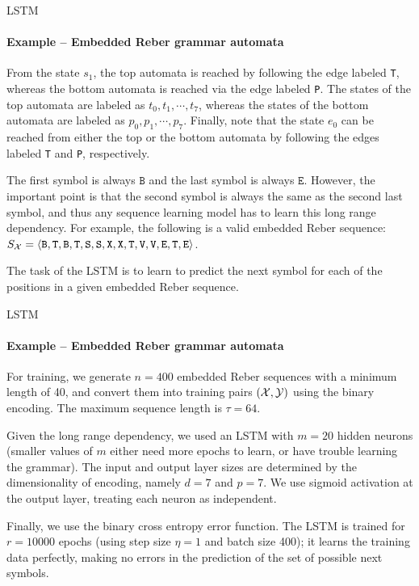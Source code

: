 \begin{frame}{LSTM}
\framesubtitle{Example -- Embedded Reber grammar automata}

\medskip

From the state $s_1$, the top automata
    is reached by following the edge labeled \texttt{T}, whereas the
    bottom automata is reached via the edge labeled \texttt{P}. 
    The states of the top automata are labeled as $t_0, t_1,\cdots,t_7$,
    whereas the states of the bottom automata are labeled as $p_0, p_1,
    \cdots, p_7$. Finally, note that the state $e_0$ can be reached
    from either the top or the bottom automata by following the edges
    labeled \texttt{T} and \texttt{P}, respectively. 

\medskip

    The first symbol is always $\texttt{B}$ and the last symbol is
    always $\texttt{E}$. However, the important point is
    that the second symbol is always the same as the second last symbol,
    and thus any sequence learning model has to learn this long range
    dependency. For example, the following is a valid embedded Reber
    sequence:
    $S_{\mathcal X} = \langle \texttt{B}, \texttt{T}, \texttt{B}, \texttt{T}, 
        \texttt{S},
        \texttt{S}, \texttt{X}, \texttt{X}, \texttt{T}, \texttt{V},
    \texttt{V}, \texttt{E}, \texttt{T}, \texttt{E} \rangle$.

	\medskip

    The task of the LSTM is to learn to predict the next symbol for each
    of the positions in a given embedded Reber sequence. 
\end{frame}

\begin{frame}{LSTM}
\framesubtitle{Example -- Embedded Reber grammar automata}
    
    For training, we
    generate $n=400$ embedded Reber sequences with a minimum length of
    40, and convert them into
    training pairs $({\mathcal X}, {\mathcal Y})$ using the binary encoding.%
    The maximum sequence length is $\tau=64$. 

\medskip
    
    Given the long range dependency, we used an LSTM with $m=20$ hidden
    neurons (smaller values of $m$ either need more epochs to
    learn, or have trouble learning the grammar).
    The input and output layer sizes are
    determined by the dimensionality of encoding, namely $d= 7$ and
    $p=7$. We use sigmoid activation at the output layer, treating
    each neuron as independent. 

\medskip

Finally, we use  the binary cross
    entropy error function. The LSTM is trained for $r=10000$ epochs
    (using step size $\eta= 1$ and batch size 400); it 
    learns the training data perfectly, making no errors in the
    prediction of the set of possible next symbols. 
\end{frame}

